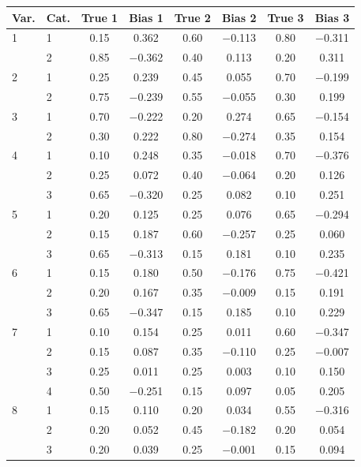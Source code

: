 \begin{table}[H]
\centering
\begin{tabular}{llcccccc}
  \toprule
\textbf{Var.} & \textbf{Cat.} & \textbf{True 1} & \textbf{Bias 1} & \textbf{True 2} & \textbf{Bias 2} & \textbf{True 3} & \textbf{Bias 3} \\ 
  \midrule
1 & 1 & 0.15 & 0.362 & 0.60 & $-$0.113 & 0.80 & $-$0.311 \\ 
   & 2 & 0.85 & $-$0.362 & 0.40 & 0.113 & 0.20 & 0.311 \\ 
  2 & 1 & 0.25 & 0.239 & 0.45 & 0.055 & 0.70 & $-$0.199 \\ 
   & 2 & 0.75 & $-$0.239 & 0.55 & $-$0.055 & 0.30 & 0.199 \\ 
  3 & 1 & 0.70 & $-$0.222 & 0.20 & 0.274 & 0.65 & $-$0.154 \\ 
   & 2 & 0.30 & 0.222 & 0.80 & $-$0.274 & 0.35 & 0.154 \\ 
  4 & 1 & 0.10 & 0.248 & 0.35 & $-$0.018 & 0.70 & $-$0.376 \\ 
   & 2 & 0.25 & 0.072 & 0.40 & $-$0.064 & 0.20 & 0.126 \\ 
   & 3 & 0.65 & $-$0.320 & 0.25 & 0.082 & 0.10 & 0.251 \\ 
  5 & 1 & 0.20 & 0.125 & 0.25 & 0.076 & 0.65 & $-$0.294 \\ 
   & 2 & 0.15 & 0.187 & 0.60 & $-$0.257 & 0.25 & 0.060 \\ 
   & 3 & 0.65 & $-$0.313 & 0.15 & 0.181 & 0.10 & 0.235 \\ 
  6 & 1 & 0.15 & 0.180 & 0.50 & $-$0.176 & 0.75 & $-$0.421 \\ 
   & 2 & 0.20 & 0.167 & 0.35 & $-$0.009 & 0.15 & 0.191 \\ 
   & 3 & 0.65 & $-$0.347 & 0.15 & 0.185 & 0.10 & 0.229 \\ 
  7 & 1 & 0.10 & 0.154 & 0.25 & 0.011 & 0.60 & $-$0.347 \\ 
   & 2 & 0.15 & 0.087 & 0.35 & $-$0.110 & 0.25 & $-$0.007 \\ 
   & 3 & 0.25 & 0.011 & 0.25 & 0.003 & 0.10 & 0.150 \\ 
   & 4 & 0.50 & $-$0.251 & 0.15 & 0.097 & 0.05 & 0.205 \\ 
  8 & 1 & 0.15 & 0.110 & 0.20 & 0.034 & 0.55 & $-$0.316 \\ 
   & 2 & 0.20 & 0.052 & 0.45 & $-$0.182 & 0.20 & 0.054 \\ 
   & 3 & 0.20 & 0.039 & 0.25 & $-$0.001 & 0.15 & 0.094 \\ 

\end{tabular}
\end{table}
